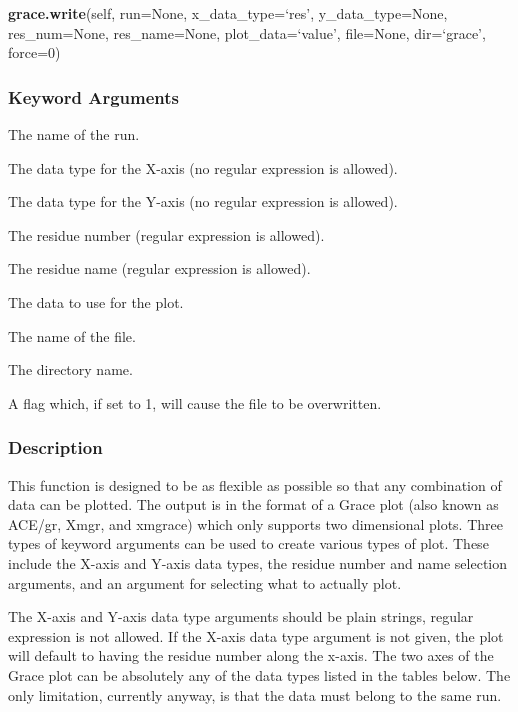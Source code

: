  \textsf{\textbf{grace.write}(self, run=None, x\_data\_type=`res', y\_data\_type=None, res\_num=None, res\_name=None, plot\_data=`value', file=None, dir=`grace', force=0)} 

  
 \subsubsection{Keyword Arguments} 

   The name of the run.   

   The data type for the X-axis (no regular expression is allowed).   

   The data type for the Y-axis (no regular expression is allowed).   

   The residue number (regular expression is allowed).   

   The residue name (regular expression is allowed).   

   The data to use for the plot.   

   The name of the file.   

   The directory name.   

   A flag which, if set to 1, will cause the file to be overwritten.  

  

  
 \subsubsection{Description} 

 This function is designed to be as flexible as possible so that any combination of data can be plotted.  The output is in the format of a Grace plot (also known as ACE/gr, Xmgr, and xmgrace) which only supports two dimensional plots.  Three types of keyword arguments can be used to create various types of plot.  These include the X-axis and Y-axis data types, the residue number and name selection arguments, and an argument for selecting what to actually plot. 
  

 The X-axis and Y-axis data type arguments should be plain strings, regular expression is not allowed.  If the X-axis data type argument is not given, the plot will default to having the residue number along the x-axis.  The two axes of the Grace plot can be absolutely any of the data types listed in the tables below.  The only limitation, currently anyway, is that the data must belong to the same run. 
  

